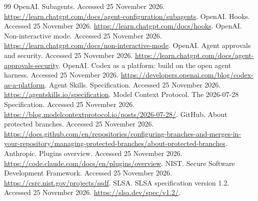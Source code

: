 \documentclass[11pt,letterpaper]{article}
\begin{document}
\begin{thebibliography}{99}
 OpenAI. Subagents. Accessed 25 November 2026. \url{https://learn.chatgpt.com/docs/agent-configuration/subagents}.
 OpenAI. Hooks. Accessed 25 November 2026. \url{https://learn.chatgpt.com/docs/hooks}.
 OpenAI. Non-interactive mode. Accessed 25 November 2026. \url{https://learn.chatgpt.com/docs/non-interactive-mode}.
 OpenAI. Agent approvals and security. Accessed 25 November 2026. \url{https://learn.chatgpt.com/docs/agent-approvals-security}.
 OpenAI. Codex as a platform: build on the open agent harness. Accessed 25 November 2026. \url{https://developers.openai.com/blog/codex-as-a-platform}.
 Agent Skills. Specification. Accessed 25 November 2026. \url{https://agentskills.io/specification}.
 Model Context Protocol. The 2026-07-28 Specification. Accessed 25 November 2026. \url{https://blog.modelcontextprotocol.io/posts/2026-07-28/}.
 GitHub. About protected branches. Accessed 25 November 2026. \url{https://docs.github.com/en/repositories/configuring-branches-and-merges-in-your-repository/managing-protected-branches/about-protected-branches}.
 Anthropic. Plugins overview. Accessed 25 November 2026. \url{https://code.claude.com/docs/en/plugins/overview}.
 NIST. Secure Software Development Framework. Accessed 25 November 2026. \url{https://csrc.nist.gov/projects/ssdf}.
 SLSA. SLSA specification version 1.2. Accessed 25 November 2026. \url{https://slsa.dev/spec/v1.2/}.
\end{thebibliography}
\end{document}
